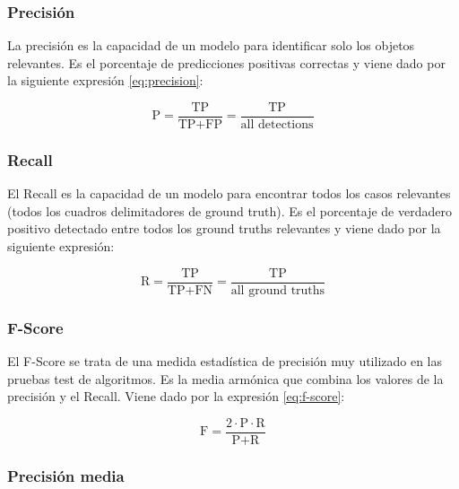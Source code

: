 \subsubsection{Precisión}
\label{subsubsec:precision}

La precisión es la capacidad de un modelo para identificar solo los objetos relevantes. Es el porcentaje de predicciones positivas correctas y viene dado por la siguiente expresión \ref{eq:precision}:

\begin{equation}
\label{eq:precision}
\text{P} = \frac{\text{TP}}{\text{TP}+\text{FP}}=\frac{\text{TP}}{\text{all detections}}
\end{equation}

\subsubsection{Recall}
\label{subsubsec:recall}

El Recall es la capacidad de un modelo para encontrar todos los casos relevantes (todos los cuadros delimitadores de ground truth). Es el porcentaje de verdadero positivo detectado entre todos los ground truths relevantes y viene dado por la siguiente expresión:

\begin{equation}
\label{eq:recall}
\text{R} = \frac{\text{TP}}{\text{TP}+\text{FN}}=\frac{\text{TP}}{\text{all ground truths}}
\end{equation}

\subsubsection{F-Score}
\label{subsubsec:f-score}

 El F-Score se trata de una medida estadística de precisión muy utilizado en las pruebas test de algoritmos. Es la media armónica que combina los valores de la precisión y el Recall. Viene dado por la expresión \ref{eq:f-score}:

\begin{equation}
\label{eq:f-score}
\text{F} = \frac{2 \cdotp \text{P} \cdotp \text{R}}{\text{P}+\text{R}}
\end{equation}

\subsubsection{Precisión media}
\label{subsubsec:averageprecision}

